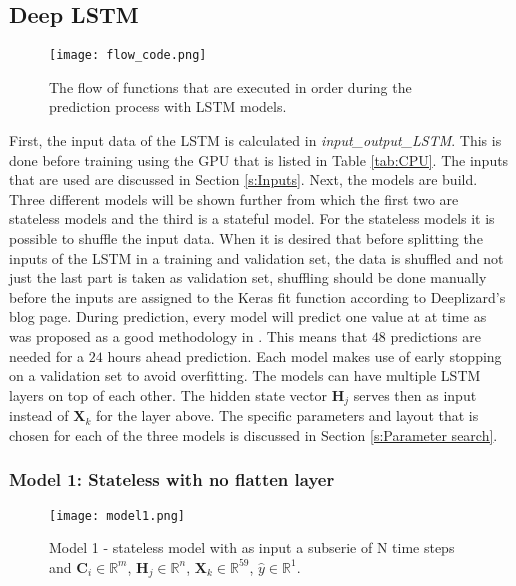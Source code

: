 \subsection{Deep LSTM}\label{s:LSTM_implementation}
\begin{figure}[ht]
	\centering
	\texttt{[image: flow\_code.png]}
	\caption{The flow of functions that are executed in order during the prediction process with LSTM models.}
	\label{fig:model1}
\end{figure}


First, the input data of the LSTM is calculated in \textit{input\_output\_LSTM}. This is done before training using the GPU that is listed in Table \ref{tab:CPU}. The inputs that are used are discussed in Section \ref{s:Inputs}. Next, the models are build. Three different models will be shown further from which the first two are stateless models and the third is a stateful model. For the stateless models it is possible to shuffle the input data. When it is desired that before splitting the inputs of the LSTM in a training and validation set, the data is shuffled and not just the last part is taken as validation set, shuffling should be done manually before the inputs are assigned to the Keras fit function according to Deeplizard's blog page. During prediction, every model will predict one value at at time as was proposed as a good methodology in \cite{ANNRNN}. This means that $ 48 $ predictions are needed for a $ 24 $ hours ahead prediction. Each model makes use of early stopping on a validation set to avoid overfitting. The models can have multiple LSTM layers on top of each other. The hidden state vector $ \bm{H}_{j} $ serves then as input instead of $ \bm{X}_{k} $ for the layer above. The specific parameters and layout that is chosen for each of the three models is discussed in Section \ref{s:Parameter search}.

\subsubsection{Model 1: Stateless with no flatten layer}\label{s:Model1}

\begin{figure}[h]
	\centering
	\texttt{[image: model1.png]}
	\caption{Model 1 - stateless model with as input a subserie of N time steps and $ \bm{C}_{i} \in \mathbb{R}^{m} $, $ \bm{H}_{j} \in \mathbb{R}^{n} $, $ \bm{X}_{k} \in \mathbb{R}^{59} $, $ \hat{y} \in \mathbb{R}^{1} $.}
	\label{fig:model1}
\end{figure}

